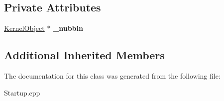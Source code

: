 \subsection*{Private Attributes}
\begin{DoxyCompactItemize}
\item 
\mbox{\label{class_startup___internal_1_1_waiting_for_nubbin_ad92f33ddb5096bd0d5a0df2f357c1580}} 
\hyperlink{class_kernel_object}{Kernel\+Object} $\ast$ {\bfseries \+\_\+nubbin}
\end{DoxyCompactItemize}
\subsection*{Additional Inherited Members}


The documentation for this class was generated from the following file\+:\begin{DoxyCompactItemize}
\item 
Startup.\+cpp\end{DoxyCompactItemize}
